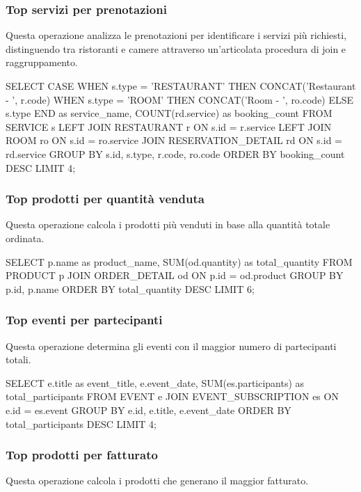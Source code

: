 \documentclass[a4paper,12pt]{report}
\begin{document}
\subsubsection{Top servizi per prenotazioni} 
Questa operazione analizza le prenotazioni per identificare i servizi più richiesti, distinguendo tra ristoranti e camere attraverso un'articolata procedura di join e raggruppamento.

\begin{sqlcode}[caption={Query per i servizi più prenotati}]
SELECT CASE WHEN s.type = 'RESTAURANT' THEN CONCAT('Restaurant - ', r.code) 
            WHEN s.type = 'ROOM' THEN CONCAT('Room - ', ro.code) 
            ELSE s.type END as service_name,
       COUNT(rd.service) as booking_count 
FROM SERVICE s 
LEFT JOIN RESTAURANT r ON s.id = r.service 
LEFT JOIN ROOM ro ON s.id = ro.service 
JOIN RESERVATION_DETAIL rd ON s.id = rd.service 
GROUP BY s.id, s.type, r.code, ro.code 
ORDER BY booking_count DESC 
LIMIT 4;
\end{sqlcode}

\subsubsection{Top prodotti per quantità venduta} 
Questa operazione calcola i prodotti più venduti in base alla quantità totale ordinata.

\begin{sqlcode}[caption={Query per i prodotti più venduti}]
SELECT p.name as product_name, SUM(od.quantity) as total_quantity 
FROM PRODUCT p 
JOIN ORDER_DETAIL od ON p.id = od.product 
GROUP BY p.id, p.name 
ORDER BY total_quantity DESC 
LIMIT 6;
\end{sqlcode}

\subsubsection{Top eventi per partecipanti} 
Questa operazione determina gli eventi con il maggior numero di partecipanti totali.

\begin{sqlcode}[caption={Query per gli eventi più partecipati}]
SELECT e.title as event_title, e.event_date, SUM(es.participants) as total_participants 
FROM EVENT e 
JOIN EVENT_SUBSCRIPTION es ON e.id = es.event 
GROUP BY e.id, e.title, e.event_date 
ORDER BY total_participants DESC 
LIMIT 4;
\end{sqlcode}

\subsubsection{Top prodotti per fatturato} 
Questa operazione calcola i prodotti che generano il maggior fatturato.
\end{document}
